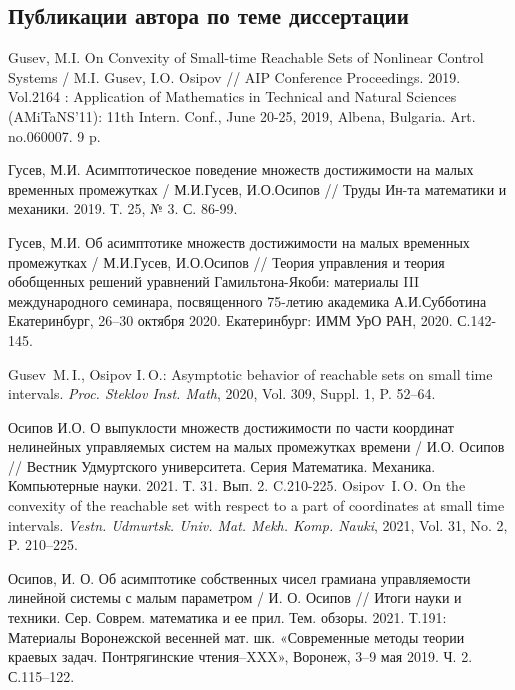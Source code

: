 \documentclass[../main.tex]{subfiles}
\begin{document}
\clearpage
\begin{thebibliography}{99}
	\subsection*{Публикации автора по теме диссертации}


	Gusev, M.I. 
	On Convexity of Small-time Reachable Sets of Nonlinear Control Systems / 
	M.I. Gusev, I.O. Osipov // 
	AIP Conference Proceedings. 
	2019. 
	Vol.2164 : 
	Application of Mathematics in Technical and Natural Sciences (AMiTaNS’11): 
	11th Intern. Conf., 
	June 20-25, 2019, Albena, Bulgaria. 
	Art. no.060007. 9 p.

	Гусев, М.И. 
	Асимптотическое поведение множеств достижимости на малых временных промежутках / 
	М.И.Гусев, И.О.Осипов // 
	Труды Ин-та математики и механики. 
	2019. Т. 25, № 3. С. 86-99. 
	
	Гусев, М.И. 
	Об асимптотике множеств достижимости на малых временных промежутках / 
	М.И.Гусев, И.О.Осипов // 
	Теория управления и теория обобщенных решений уравнений Гамильтона-Якоби: материалы III международного семинара, посвященного 75-летию академика А.И.Субботина 
	Екатеринбург, 26–30 октября 2020. 
	Екатеринбург: ИММ УрО РАН, 2020. С.142-145.

	Gusev~M.\,I., Osipov I.\,O.: Asymptotic behavior of reachable sets on small time intervals. \emph{Proc. Steklov Inst. Math}, 2020, Vol. 309, Suppl. 1, P. 52--64.  

	Осипов И.О. 
	О выпуклости множеств достижимости по части координат нелинейных управляемых систем на малых промежутках времени / 
	И.О. Осипов // 
	Вестник Удмуртского университета. Серия Математика. Механика. Компьютерные науки. 
	2021. Т. 31. Вып. 2. C.210-225.
	Osipov~I.\,O. On the convexity of the reachable set with respect to a part of coordinates at small time intervals. 
	\emph{Vestn. Udmurtsk. Univ. Mat. Mekh. Komp. Nauki}, 2021,  Vol. 31, No. 2, P. 210--225.

	Осипов, И. О. 
	Об асимптотике собственных чисел грамиана управляемости линейной системы с малым параметром / 
	И. О. Осипов // 
	Итоги науки и техники. Сер. Соврем. математика и ее прил. Тем. обзоры. 
	2021. Т.191: Материалы Воронежской весенней мат. шк. «Современные методы теории краевых задач. Понтрягинские чтения–XXX», 
	Воронеж, 3–9 мая 2019. Ч. 2. С.115–122.


\end{thebibliography}
\end{document}
